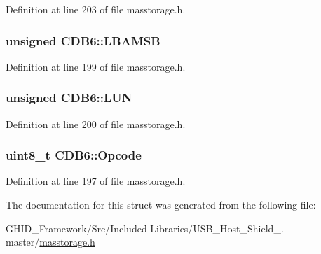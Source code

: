\-Definition at line 203 of file masstorage.\-h.

\hypertarget{struct_c_d_b6_a1d5e2c34147b5ecc84d20f10e307fd1e}{
\subsubsection[{\-L\-B\-A\-M\-S\-B}]{\setlength{\rightskip}{0pt plus 5cm}unsigned {\bf \-C\-D\-B6\-::\-L\-B\-A\-M\-S\-B}}}\label{struct_c_d_b6_a1d5e2c34147b5ecc84d20f10e307fd1e}


\-Definition at line 199 of file masstorage.\-h.

\hypertarget{struct_c_d_b6_ada1275c63867c75daf71348ec1f8d666}{
\subsubsection[{\-L\-U\-N}]{\setlength{\rightskip}{0pt plus 5cm}unsigned {\bf \-C\-D\-B6\-::\-L\-U\-N}}}\label{struct_c_d_b6_ada1275c63867c75daf71348ec1f8d666}


\-Definition at line 200 of file masstorage.\-h.

\hypertarget{struct_c_d_b6_af2b06ea02758f3096f48da306371a7d8}{
\subsubsection[{\-Opcode}]{\setlength{\rightskip}{0pt plus 5cm}uint8\-\_\-t {\bf \-C\-D\-B6\-::\-Opcode}}}\label{struct_c_d_b6_af2b06ea02758f3096f48da306371a7d8}


\-Definition at line 197 of file masstorage.\-h.



\-The documentation for this struct was generated from the following file\-:\begin{DoxyCompactItemize}
\item 
\-G\-H\-I\-D\-\_\-\-Framework/\-Src/\-Included Libraries/\-U\-S\-B\-\_\-\-Host\-\_\-\-Shield\-\_.-\/master/\hyperlink{masstorage_8h}{masstorage.\-h}\end{DoxyCompactItemize}
